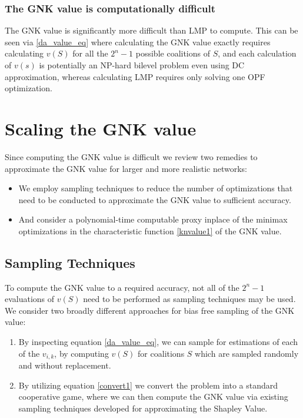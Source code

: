 \subsubsection*{The GNK value is computationally difficult}
The GNK value is significantly more difficult than LMP to compute.
This can be seen via \eqref{da_value_eq} where calculating the GNK value exactly requires calculating $v(S)$ for all the $2^n-1$ possible coalitions of $S$, and each calculation of $v(s)$ is potentially an NP-hard bilevel problem even using DC approximation, whereas calculating LMP requires only solving one OPF optimization.


\section{Scaling the GNK value}\label{sec:scaling}

Since computing the GNK value is difficult we review two remedies to approximate the GNK value for larger and more realistic networks:

\begin{itemize}
    \item We employ sampling techniques to reduce the number of optimizations that need to be conducted to approximate the GNK value to sufficient accuracy.
    \item And consider a polynomial-time computable proxy inplace of the minimax optimizations in the characteristic function \eqref{knvalue1} of the GNK value.
\end{itemize}

\subsection{Sampling Techniques}\label{sec:sampling_techniques}
To compute the GNK value to a required accuracy, not all of the $2^n-1$ evaluations of $v(S)$ need to be performed as sampling techniques may be used.
We consider two broadly different approaches for bias free sampling of the GNK value:
\begin{enumerate}
    \item By inspecting equation \ref{da_value_eq}, we can sample for estimations of each of the $v_{i,k}$, by computing $v(S)$ for coalitions $S$ which are sampled randomly and without replacement.
    \item By utilizing equation \ref{convert1} we convert the problem into a standard cooperative game, where we can then compute the GNK value via existing sampling techniques developed for approximating the Shapley Value.
\end{enumerate}

